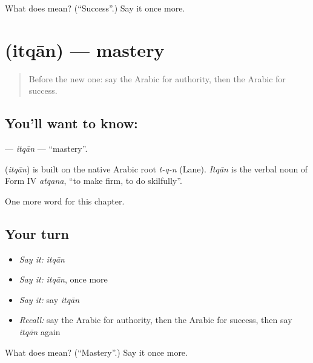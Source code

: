 \begin{tcolorbox}[breakable,colback=teal!4,colframe=teal!35!black,title={Before you move on}]
What does  mean? (\textquotedblleft{}Success\textquotedblright{}.) Say it once more.
\end{tcolorbox}
\section[\texorpdfstring{\ar{إتقان} (itqān)}{إتقان (itqān)}]{ (itqān) — mastery}

\label{lesson:AR-C106-itqan}



\begin{quote}
Before the new one: say the Arabic for authority, then the Arabic for success.
\end{quote}

\subsection*{You'll want to know: }
\textbf{} — \emph{itqān} — \textquotedblleft{}mastery\textquotedblright{}.

\begin{cousinweb}
\textbf{} (\emph{itqān}) is built on the native Arabic root \emph{t-q-n} (Lane). \emph{Itqān} is the verbal noun of Form IV \emph{atqana}, \textquotedblleft{}to make firm, to do skilfully\textquotedblright{}.
\end{cousinweb}

\begin{grammarlens}[title={What you've built}]
One more word for this chapter.
\end{grammarlens}

\subsection*{Your turn}
\begin{itemize}
\raggedright
  \item \emph{Say it:} \emph{itqān}
  \item \emph{Say it:} \emph{itqān}, once more
  \item \emph{Say it:} say \emph{itqān}
  \item \emph{Recall:} say the Arabic for authority, then the Arabic for success, then say \emph{itqān} again
\end{itemize}

\begin{tcolorbox}[breakable,colback=teal!4,colframe=teal!35!black,title={Before you move on}]
What does  mean? (\textquotedblleft{}Mastery\textquotedblright{}.) Say it once more.
\end{tcolorbox}
